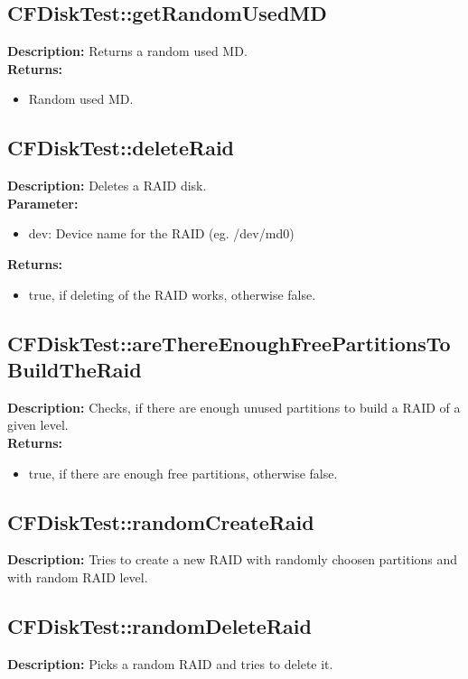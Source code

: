 \subsection{CFDiskTest::getRandomUsedMD}
\textbf{Description:} Returns a random used MD.\\
\textbf{Returns:}
\begin{itemize}
\item Random used MD.
\end{itemize}

\subsection{CFDiskTest::deleteRaid}
\textbf{Description:} Deletes a RAID disk.\\
\textbf{Parameter:}
\begin{itemize}
\item dev: Device name for the RAID (eg. /dev/md0)
\end{itemize}
\textbf{Returns:}
\begin{itemize}
\item true, if deleting of the RAID works, otherwise false.
\end{itemize}

\subsection{CFDiskTest::areThereEnoughFreePartitionsToBuildTheRaid}
\textbf{Description:} Checks, if there are enough unused partitions to build a RAID of a given level.\\
\textbf{Returns:}
\begin{itemize}
\item true, if there are enough free partitions, otherwise false.
\end{itemize}

\subsection{CFDiskTest::randomCreateRaid}
\textbf{Description:} Tries to create a new RAID with randomly choosen partitions and with random RAID level.\\

\subsection{CFDiskTest::randomDeleteRaid}
\textbf{Description:} Picks a random RAID and tries to delete it.\\

